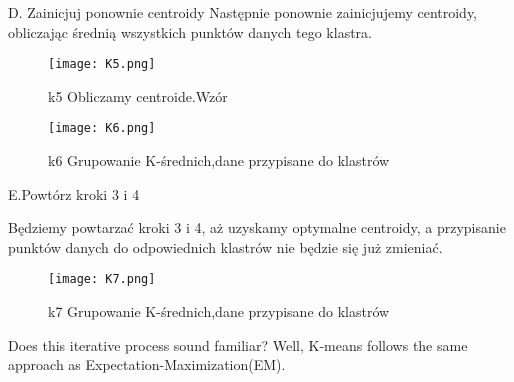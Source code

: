    D.  Zainicjuj ponownie centroidy
Następnie ponownie zainicjujemy centroidy, obliczając średnią wszystkich punktów danych tego klastra.
\begin{figure}[!h]
    \label{fig:k5}
    \centering \texttt{[image: K5.png]}
    \caption{k5 Obliczamy centroide.Wzór\cite{clust2020}}
\end{figure}

\begin{figure}[!h]
    \label{fig:k6}
    \centering \texttt{[image: K6.png]}
    \caption{k6 Grupowanie K-średnich,dane przypisane do klastrów\cite{clust2020}}
\end{figure}
\newpage
     E.Powtórz kroki 3 i 4

Będziemy powtarzać kroki 3 i 4, aż uzyskamy optymalne centroidy, a przypisanie punktów danych do odpowiednich klastrów nie będzie się już zmieniać.
\begin{figure}[!h]
    \label{fig:k7}
    \centering \texttt{[image: K7.png]}
    \caption{k7 Grupowanie K-średnich,dane przypisane do klastrów\cite{clust2020}}
\end{figure}

Does this iterative process sound familiar? Well, K-means follows the same approach as Expectation-Maximization(EM). \cite{clust2020}

\newpage


